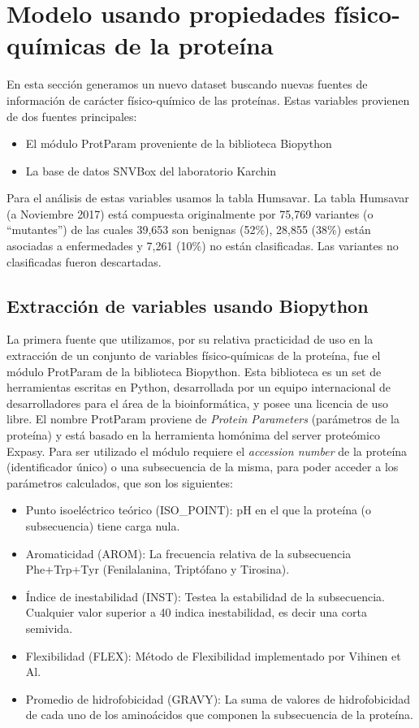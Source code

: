 
\section{Modelo usando propiedades físico-químicas de la proteína}

En esta sección generamos un nuevo dataset buscando nuevas fuentes de información de carácter físico-químico de las proteínas. Estas variables provienen de dos fuentes principales:

\begin{itemize}
    \item El módulo ProtParam proveniente de la biblioteca Biopython \cite{Chapman:2000:BPT:360262.360268}
    \item La base de datos SNVBox del laboratorio Karchin \cite{Wong2011}
\end{itemize}

Para el análisis de estas variables usamos la tabla Humsavar. La tabla Humsavar (a Noviembre 2017) está compuesta originalmente por 75,769 variantes (o ``mutantes'') de las cuales 39,653 son benignas (52\%), 28,855 (38\%) están asociadas a enfermedades y 7,261 (10\%) no están clasificadas. Las variantes no clasificadas fueron descartadas. 

\subsection{Extracción de variables usando Biopython}

La primera fuente que utilizamos, por su relativa practicidad de uso en la extracción de un conjunto de variables físico-químicas de la proteína, fue el módulo ProtParam de la biblioteca Biopython. Esta biblioteca es un set de herramientas escritas en Python, desarrollada por un equipo internacional de desarrolladores para el área de la bioinformática, y posee una licencia de uso libre.
El nombre ProtParam proviene de \textit{Protein Parameters} (parámetros de la proteína) y está basado en la herramienta homónima del server proteómico Expasy. Para ser utilizado el módulo requiere el \textit{accession number} de la proteína (identificador único) o una subsecuencia de la misma, para poder acceder a los parámetros calculados, que son los siguientes:

\begin{itemize}
    \item Punto isoeléctrico teórico (ISO\_POINT): pH en el que la proteína (o subsecuencia) tiene carga nula. 
    \item Aromaticidad (AROM): La frecuencia relativa de la subsecuencia Phe+Trp+Tyr (Fenilalanina, Triptófano y Tirosina). 
    \item Índice de inestabilidad (INST): Testea la estabilidad de la subsecuencia. Cualquier valor superior a 40 indica inestabilidad, es decir una corta semivida.
    \item Flexibilidad (FLEX): Método de Flexibilidad implementado por Vihinen et Al.  
    \item Promedio de hidrofobicidad (GRAVY): La suma de valores de hidrofobicidad de cada uno de los aminoácidos que componen la subsecuencia de la proteína.
\end{itemize}

